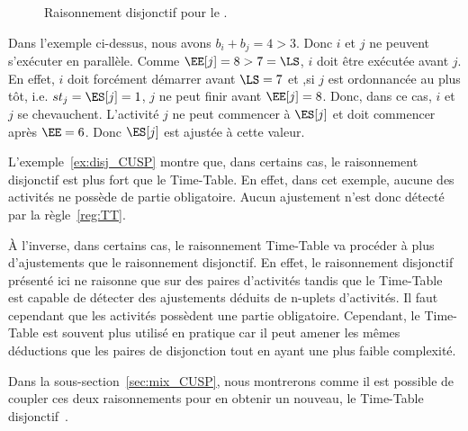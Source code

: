 \begin{ex}
\begin{figure}[htb!]
  \caption{Raisonnement disjonctif pour le \CUSP.}
  \label{fig:disj_CUSP}
\end{figure}
Dans l'exemple ci-dessus, nous avons $b_i+b_j=4 > 3$. Donc $i$ et $j$
ne peuvent s'exécuter en parallèle. Comme $\EE[j] = 8 > 7=\LS$, $i$
doit être exécutée avant $j$. En effet, $i$ doit forcément
démarrer avant $\LS=7$ et ,si $j$ est ordonnancée au plus tôt,
i.e. $st_j=\ES[j]=1$, $j$ ne peut finir avant $\EE[j]=8$. Donc, dans
ce cas, $i$ et $j$ se chevauchent. L'activité $j$ ne peut commencer à
$\ES[j]$ et doit commencer après $\EE=6$. Donc $\ES[j]$ est ajustée à
cette valeur.
\end{ex}

L'exemple~\ref{ex:disj_CUSP} montre que, dans certains cas, le
raisonnement disjonctif est plus fort que le Time-Table. En effet,
dans cet exemple, aucune des activités ne possède de partie
obligatoire. Aucun ajustement n'est donc détecté par la
règle~\ref{reg:TT}. 

{\`A} l'inverse, dans certains cas, le raisonnement Time-Table va
procéder à plus d'ajustements que le raisonnement disjonctif. En
effet, le raisonnement disjonctif présenté ici ne raisonne que sur des
paires d'activités tandis que le Time-Table est capable de détecter
des ajustements déduits de n-uplets d'activités. Il faut cependant que
les activités possèdent une partie obligatoire. Cependant, le
Time-Table est souvent plus utilisé en pratique car il peut amener les
mêmes déductions que les paires de disjonction tout en ayant une plus
faible complexité.

Dans la sous-section~\ref{sec:mix_CUSP}, nous montrerons comme il est
possible de coupler ces deux raisonnements pour en obtenir un nouveau,
le Time-Table disjonctif~\cite{Gay2015}. 

